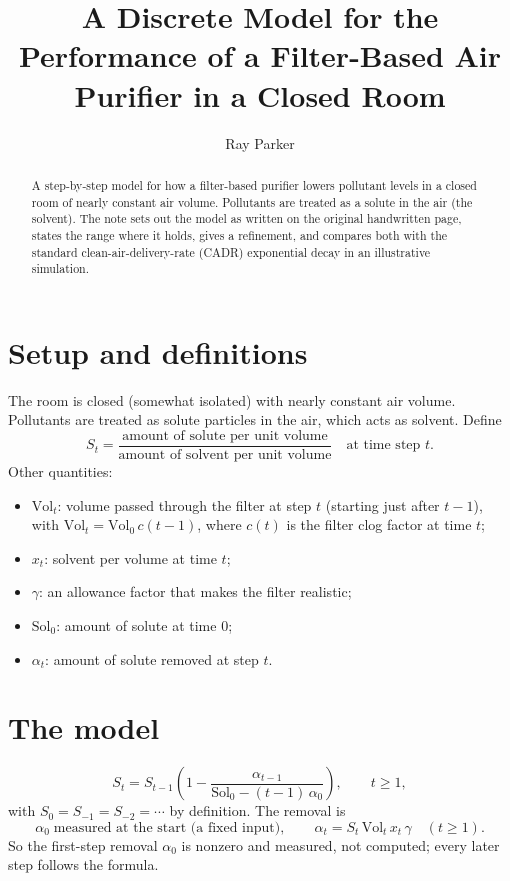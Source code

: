 \documentclass[11pt]{article}
\title{A Discrete Model for the Performance of a Filter-Based Air Purifier in a Closed Room}
\author{Ray Parker}\date{}
\begin{document}
\maketitle
\begin{abstract}
A step-by-step model for how a filter-based purifier lowers pollutant levels in a closed room of nearly constant air volume. Pollutants are treated as a solute in the air (the solvent). The note sets out the model as written on the original handwritten page, states the range where it holds, gives a refinement, and compares both with the standard clean-air-delivery-rate (CADR) exponential decay in an illustrative simulation.
\end{abstract}

\section{Setup and definitions}
The room is closed (somewhat isolated) with nearly constant air volume. Pollutants are treated as solute particles in the air, which acts as solvent. Define
\[ S_t=\frac{\text{amount of solute per unit volume}}{\text{amount of solvent per unit volume}}\quad\text{at time step } t. \]
Other quantities:
\begin{itemize}
\item $\mathrm{Vol}_t$: volume passed through the filter at step $t$ (starting just after $t-1$), with $\mathrm{Vol}_t=\mathrm{Vol}_0\,c(t-1)$, where $c(t)$ is the filter clog factor at time $t$;
\item $x_t$: solvent per volume at time $t$;
\item $\gamma$: an allowance factor that makes the filter realistic;
\item $\mathrm{Sol}_0$: amount of solute at time $0$;
\item $\alpha_t$: amount of solute removed at step $t$.
\end{itemize}

\section{The model}
\begin{equation}\label{eq:main}
S_t=S_{t-1}\left(1-\frac{\alpha_{t-1}}{\mathrm{Sol}_0-(t-1)\,\alpha_0}\right),\qquad t\ge1,
\end{equation}
with $S_0=S_{-1}=S_{-2}=\cdots$ by definition. The removal is
\begin{equation}\label{eq:alpha}
\alpha_0 \;\text{measured at the start (a fixed input)},\qquad
\alpha_t=S_t\,\mathrm{Vol}_t\,x_t\,\gamma\quad(t\ge1).
\end{equation}
So the first-step removal $\alpha_0$ is nonzero and measured, not computed; every later step follows the formula.
\end{document}
